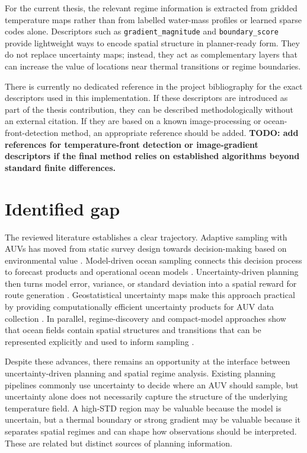 For the current thesis, the relevant regime information is extracted from gridded temperature maps rather than from labelled water-mass profiles or learned sparse codes alone. Descriptors such as \texttt{gradient\_magnitude} and \texttt{boundary\_score} provide lightweight ways to encode spatial structure in planner-ready form. They do not replace uncertainty maps; instead, they act as complementary layers that can increase the value of locations near thermal transitions or regime boundaries.

There is currently no dedicated reference in the project bibliography for the exact descriptors used in this implementation. If these descriptors are introduced as part of the thesis contribution, they can be described methodologically without an external citation. If they are based on a known image-processing or ocean-front-detection method, an appropriate reference should be added. \textbf{TODO: add references for temperature-front detection or image-gradient descriptors if the final method relies on established algorithms beyond standard finite differences.}

\section{Identified gap}
\label{sec:sota_identified_gap}

The reviewed literature establishes a clear trajectory. Adaptive sampling with AUVs has moved from static survey design towards decision-making based on environmental value \parencite{curtin2009aosn,hwang2019auvreview}. Model-driven ocean sampling connects this decision process to forecast products and operational ocean models \parencite{lermusiaux2007adaptive,mendes2025oceanmodeldriven}. Uncertainty-driven planning then turns model error, variance, or standard deviation into a spatial reward for route generation \parencite{frolov2014grid,bernacchi2025closingloop}. Geostatistical uncertainty maps make this approach practical by providing computationally efficient uncertainty products for AUV data collection \parencite{duarte2025geostatistical}. In parallel, regime-discovery and compact-model approaches show that ocean fields contain spatial structures and transitions that can be represented explicitly and used to inform sampling \parencite{fossum2020compact,ge2023watermasses}.

Despite these advances, there remains an opportunity at the interface between uncertainty-driven planning and spatial regime analysis. Existing planning pipelines commonly use uncertainty to decide where an AUV should sample, but uncertainty alone does not necessarily capture the structure of the underlying temperature field. A high-STD region may be valuable because the model is uncertain, but a thermal boundary or strong gradient may be valuable because it separates spatial regimes and can shape how observations should be interpreted. These are related but distinct sources of planning information.

